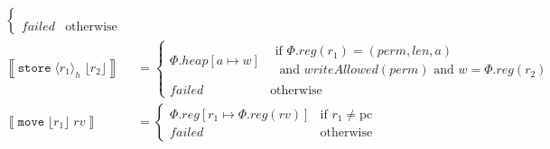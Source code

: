 \documentclass{article}
\newcommand{\update}[2]{[#1 \mapsto #2]}%
\newcommand{\var}[1]{\mathit{#1}}
\newcommand{\rv}{rv}
\newcommand{\pcreg}{\mathrm{pc}}
\newcommand{\addr}{a}
\newcommand{\len}{len}
\newcommand{\reg}{reg}
\newcommand{\heap}{heap}
\newcommand{\perm}{perm}
\newcommand{\failed}{failed}
\newcommand{\writeAllowed}[1]{\mathit{writeAllowed}(#1)}
\newcommand{\refreg}[1]{\lfloor #1 \rfloor}
\newcommand{\refheap}[1]{\langle #1 \rangle_h}
\newcommand{\instr}[1]{\mathtt{#1}}
\newcommand{\twoinstr}[3]{\instr{#1} \; #2 \; #3}
\newcommand{\move}[2]{\twoinstr{move}{#1}{#2}}
\newcommand{\store}[2]{\twoinstr{store}{#1}{#2}}
\newcommand{\sem}[1]{\left\llbracket #1 \right\rrbracket}
\begin{document}
\begin{align*}
\begin{cases}
\begin{array}{l}
                                   \end{array}\\
                                   \failed & \text{otherwise }
                                 \end{cases}\\
 \sem{\store{\refheap{r_1}}{\refreg{r_2}}} & =
                                 \begin{cases}
                                   \Phi.\heap\update{\addr}{\var{w}} &
                                   \begin{array}{l}
                                     \text{if }\Phi.\reg(r_1) = (\perm,\len,\addr)\\
                                     \text{  and }\writeAllowed{\perm} \text{ and } \var{w} = \Phi.\reg(r_2)
                                   \end{array}\\
                                   \failed & \text{otherwise }
                                 \end{cases}\\
 \sem{\move{\refreg{r_1}}{\rv}} & =
                                 \begin{cases}
                                   \Phi.\reg\update{r_1}{\Phi.\reg(\rv)} & \text{if $r_1 \neq \pcreg$} \\
                                   \failed   & \text{otherwise }
                                 \end{cases}\\
\end{align*}
\end{document}
